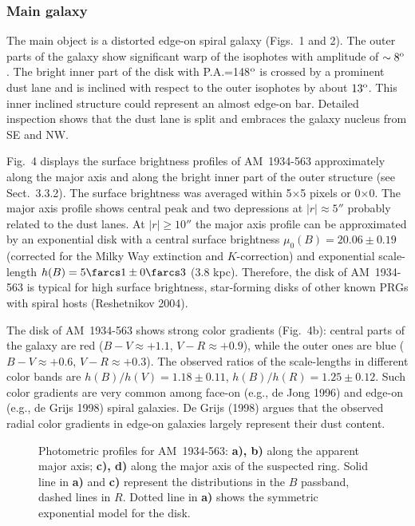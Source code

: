 \documentclass[]{aa}
\begin{document}
\subsubsection{Main galaxy}

The main object is a distorted edge-on spiral galaxy (Figs.~1 and 2).
The outer parts of the galaxy show significant warp of the isophotes
with amplitude of $\sim8^{\rm o}$. The bright inner part of the disk with P.A.=148$^{\rm o}$ is crossed by a prominent dust lane and is inclined with respect to the outer isophotes by about $13^{\rm o}$. This inner inclined structure could represent an almost edge-on bar. Detailed inspection shows that
the dust lane is split and embraces the galaxy nucleus from SE and NW. 

Fig.~4 displays the surface brightness profiles of AM~1934-563
approximately along the major axis and along the bright inner
part of the outer structure (see Sect.~3.3.2). The surface brightness
was averaged within 5$\times$5 pixels or 0$\times$0.
The major axis profile
shows central peak and two depressions at $\mid r \mid \approx 5''$
probably related to the dust lanes. At $\mid r \mid \geq 10''$
the major axis profile can be approximated by an exponential
disk with a central surface brightness $\mu_0(B)=20.06 \pm 0.19$
(corrected for the Milky Way extinction and $K$-correction) and 
exponential scale-length $h(B)=5\farcs1 \pm 0\farcs3$ (3.8 kpc).
Therefore, the disk of AM~1934-563 is typical for high surface 
brightness, star-forming disks of other known PRGs with spiral hosts 
(Reshetnikov 2004). 

The disk of AM~1934-563 shows strong color gradients (Fig.~4b):
central parts of the galaxy are red ($B-V \approx +1.1$,
$V-R \approx +0.9$), while the outer ones are blue 
($B-V \approx +0.6$, $V-R \approx +0.3$). The observed ratios
of the scale-lengths in different color bands are 
$h(B)/h(V)=1.18\pm0.11$, $h(B)/h(R)=1.25\pm0.12$. 
Such color gradients are very common among face-on (e.g., de Jong 1996) 
and edge-on (e.g., de Grijs 1998) spiral galaxies. De Grijs (1998)
argues that the observed radial color gradients in edge-on
galaxies largely represent their dust content.   

\begin{figure}
\centerline{}
\caption{Photometric profiles for AM~1934-563: {\bf a), b)} along
the apparent major axis; {\bf c), d)} along the major axis of
the suspected ring. Solid line in {\bf a)} and {\bf c)} represent
the distributions in the $B$ passband, dashed lines in $R$.
Dotted line in {\bf a)} shows the symmetric exponential model
for the disk.}
\end{figure}
\end{document}
